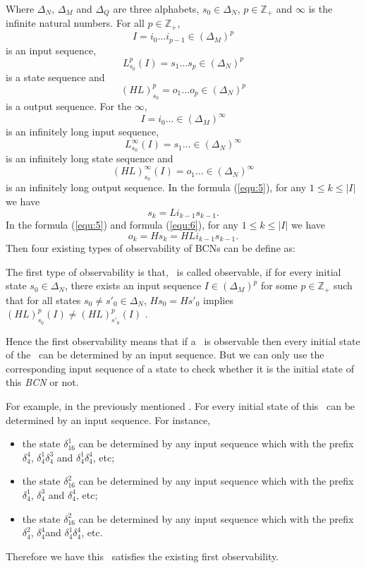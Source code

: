 Where $\Delta_N$, $\Delta_M$ and $\Delta_Q$ are three alphabets, $s_0\in \Delta_N$, $p\in \mathbb{Z}_+$ and $\infty$ is the infinite natural numbers. For all  $p\in \mathbb{Z}_+$, \[I=i_0 \ldots i_{p-1} \in(\Delta_M)^p\] is an input sequence, \[L^p_{s_0}(I)=s_1 \ldots s_{p} \in(\Delta_N)^p\] is a state sequence and \[(HL)^p_{s_0}=o_1 \ldots o_{p} \in(\Delta_N)^p\] is a output sequence. For the $\infty$, \[I=i_0 \ldots  \in(\Delta_M)^{\infty}\] is an infinitely long input sequence, \[L^{\infty}_{s_0}(I)=s_1 \ldots  \in(\Delta_N)^{\infty}\] is an infinitely long state sequence and \[(HL)^{\infty}_{s_0}(I)=o_1 \ldots \in(\Delta_N)^{\infty}\] is an infinitely long output sequence. In the formula (\ref{equ:5}), for any $1\le k \le |I|$ we have \[s_k=Li_{k-1}s_{k-1}.\] In the formula (\ref{equ:5}) and formula (\ref{equ:6}), for any $1\le k \le |I|$ we have  \[o_k=Hs_k=HLi_{k-1}s_{k-1}.\] Then four existing types of observability of BCNs can be define as: 
\begin{definition}
The first type of observability is that, \BCN\ is called observable, if for every initial state $s_0 \in \Delta_N$, there exists an input sequence $I\in(\Delta_M)^p$ for some $p\in \mathbb{Z}_+$ such that for all states $s_0\neq {s'}_0\in \Delta_N$, $Hs_0=H{s'}_0$ implies $(HL)^p_{s_0}(I)\neq (HL)^p_{{s'}_0}(I)$ \cite{cheng2009controllability}.
\end{definition}

Hence the first observability means that if a \BCN\ is observable then every initial state of the \BCN\ can be determined by an input sequence. But we can only use the corresponding input sequence of a state to check whether it is the initial state of this {\em BCN} or not.
\begin{example}
For example, in the previously mentioned \BCN. For every initial state of this \BCN\ can be determined by an input sequence.  For instance,
\begin{itemize}
  \item the state $\delta_{16}^1$ can be determined by any input sequence which with the prefix $\delta_{4}^4$, $\delta_{4}^1 \delta_{4}^3$ and $\delta_{4}^1 \delta_{4}^4$, etc;
  \item the state $\delta_{16}^2$ can be determined by any input sequence which with the prefix $\delta_{4}^1$, $\delta_{4}^3$ and $\delta_{4}^4$, etc;
  \item the state $\delta_{16}^2$ can be determined by any input sequence which with the prefix $\delta_{4}^2$, $\delta_{4}^4$and $\delta_{4}^1 \delta_{4}^4$, etc.
\end{itemize} 
Therefore we have this \BCN\ satisfies the existing first observability.
\end{example}   

